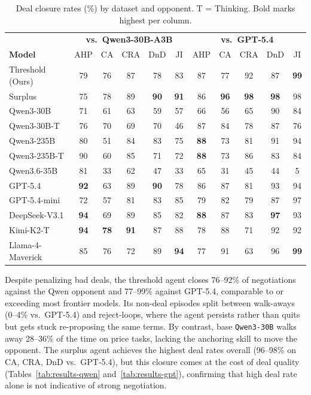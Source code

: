 \documentclass[11pt]{article}
\newcommand{\model}[1]{\texttt{#1}}
\newcommand{\lightrule}{\arrayrulecolor{black!20}\midrule\arrayrulecolor{black}}
\begin{document}
\begin{table}[ht]
\centering
\scriptsize
\setlength{\tabcolsep}{3pt}
\renewcommand{\arraystretch}{1.15}
\begin{tabular}{l ccccc ccccc}
\toprule
\rowcolor{tableheader}
& \multicolumn{5}{c}{\textbf{vs.\ Qwen3-30B-A3B}} & \multicolumn{5}{c}{\textbf{vs.\ GPT-5.4}} \\
\rowcolor{tableheader}
\textbf{Model} & AHP & CA & CRA & DnD & JI & AHP & CA & CRA & DnD & JI \\
\midrule
\rowcolor{tablerow}
Threshold (Ours) & 79 & 76 & 87 & 78 & 83 & 87 & 77 & 92 & 87 & \textbf{99} \\
Surplus          & 75 & 78 & 89 & \textbf{90} & \textbf{91} & 86 & \textbf{96} & \textbf{98} & \textbf{98} & 98 \\
\lightrule
\rowcolor{tablerow}
Qwen3-30B        & 71 & 61 & 63 & 59 & 57 & 66 & 56 & 65 & 90 & 84 \\
Qwen3-30B-T      & 76 & 70 & 69 & 70 & 46 & 87 & 84 & 78 & 87 & 76 \\
\rowcolor{tablerow}
Qwen3-235B       & 80 & 51 & 84 & 83 & 75 & \textbf{88} & 73 & 81 & 91 & 94 \\
Qwen3-235B-T     & 90 & 60 & 85 & 71 & 72 & \textbf{88} & 73 & 86 & 83 & 84 \\
\rowcolor{tablerow}
Qwen3.6-35B      & 81 & 33 & 62 & 47 & 33 & 65 & 31 & 45 & 44 & 5 \\
GPT-5.4          & \textbf{92} & 63 & 89 & \textbf{90} & 78 & 86 & 87 & 81 & 93 & 94 \\
\rowcolor{tablerow}
GPT-5.4-mini     & 72 & 57 & 81 & 83 & 85 & 79 & 82 & 79 & 87 & 97 \\
DeepSeek-V3.1    & \textbf{94} & 69 & 89 & 85 & 82 & \textbf{88} & 87 & 83 & \textbf{97} & 93 \\
\rowcolor{tablerow}
Kimi-K2-T        & \textbf{94} & \textbf{78} & \textbf{91} & 87 & 88 & 78 & 88 & 71 & 92 & 92 \\
Llama-4-Maverick & 85 & 76 & 72 & 89 & \textbf{94} & 77 & 91 & 63 & 96 & \textbf{99} \\
\bottomrule
\end{tabular}
\caption{Deal closure rates (\%) by dataset and opponent. T = Thinking. Bold marks highest per column.}
\label{tab:deal_rates}
\end{table}

Despite penalizing bad deals, the threshold agent closes 76--92\% of negotiations against the Qwen opponent and 77--99\% against GPT-5.4, comparable to or exceeding most frontier models. Its non-deal episodes split between walk-aways (0--4\% vs.\ GPT-5.4) and reject-loops, where the agent persists rather than quits but gets stuck re-proposing the same terms. By contrast, base \model{Qwen3-30B} walks away 28--36\% of the time on price tasks, lacking the anchoring skill to move the opponent. The surplus agent achieves the highest deal rates overall (96--98\% on CA, CRA, DnD vs.\ GPT-5.4), but this closure comes at the cost of deal quality (Tables~\ref{tab:results-qwen} and~\ref{tab:results-gpt}), confirming that high deal rate alone is not indicative of strong negotiation.
\end{document}
